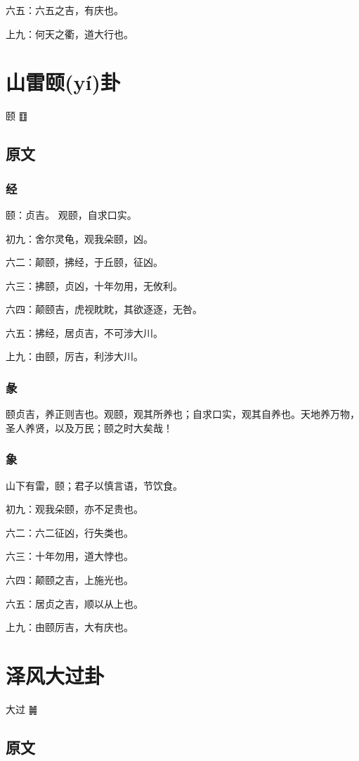 \documentclass[12pt,oneside]{book}
\begin{document}
六五：六五之吉，有庆也。

上九：何天之衢，道大行也。

\chapter{山雷颐(yí)卦}
颐 {\Large ䷚}

\section{原文}

\subsection{经}
颐：贞吉。 观颐，自求口实。

初九：舍尔灵龟，观我朵颐，凶。

六二：颠颐，拂经，于丘颐，征凶。

六三：拂颐，贞凶，十年勿用，无攸利。

六四：颠颐吉，虎视眈眈，其欲逐逐，无咎。

六五：拂经，居贞吉，不可涉大川。

上九：由颐，厉吉，利涉大川。

\subsection{彖}
颐贞吉，养正则吉也。观颐，观其所养也；自求口实，观其自养也。天地养万物，圣人养贤，以及万民；颐之时大矣哉！
\subsection{象}
山下有雷，颐；君子以慎言语，节饮食。

初九：观我朵颐，亦不足贵也。

六二：六二征凶，行失类也。

六三：十年勿用，道大悖也。

六四：颠颐之吉，上施光也。

六五：居贞之吉，顺以从上也。

上九：由颐厉吉，大有庆也。

\chapter{泽风大过卦}
大过 {\Large ䷛}

\section{原文}
\end{document}

